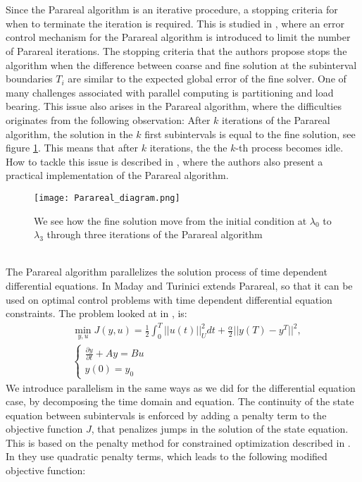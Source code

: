 \\
\\
Since the Parareal algorithm is an iterative procedure, a stopping criteria for when to terminate the iteration is required. This is studied in \cite{lepsa2010efficient}, where an error control mechanism for the Parareal algorithm is introduced to limit the number of Parareal iterations. The stopping criteria that the authors propose stops the algorithm when the difference between coarse and fine solution at the subinterval boundaries $T_i$ are similar to the expected global error of the fine solver. One of many challenges associated with parallel computing is partitioning and load bearing. This issue also arises in the Parareal algorithm, where the difficulties originates from the following observation: After $k$ iterations of the Parareal algorithm, the solution in  the $k$ first subintervals is equal to the fine solution, see figure \ref{Parareal_move_fig}. This means that after $k$ iterations, the the $k$-th process becomes idle. How to tackle this issue is described in \cite{aubanel2011scheduling}, where the authors also present a practical implementation of the Parareal algorithm. 
\\
\begin{figure}[h]
\centering
\texttt{[image: Parareal\_diagram.png]}
\caption{We see how the fine solution move from the initial condition at $\lambda_0$ to $\lambda_3$ through three iterations of the Parareal algorithm}
\label{Parareal_move_fig}
\end{figure}
\noindent
\\
The Parareal algorithm parallelizes the solution process of time dependent differential equations. In \cite{maday2002parareal} Maday and Turinici extends Parareal, so that it can be used on optimal control problems with time dependent differential equation constraints. The problem looked at in \cite{maday2002parareal}, is: 
\begin{align*}
&\min_{y,u}J(y,u) = \frac{1}{2}\int_0^T||u(t)||_U^2dt + \frac{\alpha}{2}||y(T)-y^T||^2,\\
&\left\{
     \begin{array}{lr}
       	\frac{\partial y}{\partial t}+Ay = Bu\\
       	   y(0)=y_0
     \end{array}
   \right.
\end{align*}
We introduce parallelism in the same ways as we did for the differential equation case, by decomposing the time domain and equation. The continuity of the state equation between subintervals is enforced by adding a penalty term to the objective function $J$, that penalizes jumps in the solution of the state equation. This is based on the penalty method for constrained optimization described in \cite{nocedal2006numerical}. In \cite{maday2002parareal} they use quadratic penalty terms, which leads to the following modified objective function:

